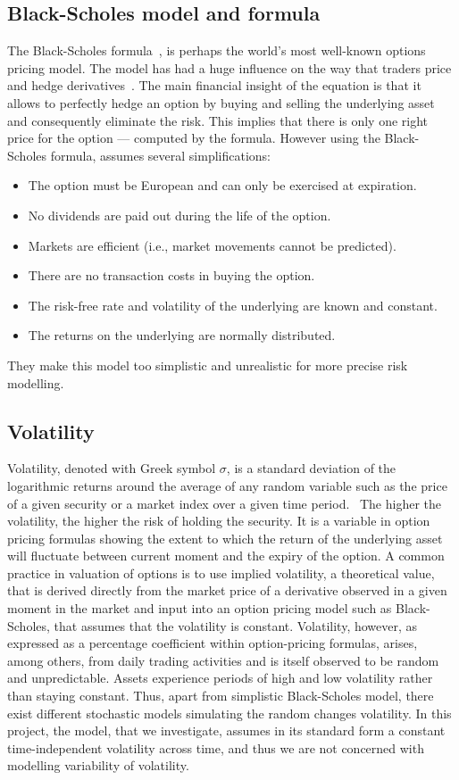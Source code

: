 \subsection{Black-Scholes model and formula}
The Black-Scholes formula~\cite{blackscholes}, is perhaps the world's most well-known options pricing model. The model has had a huge influence on the way that traders price and hedge derivatives~\cite[pg.299-324]{ofod}. The main financial insight of the equation is that it allows to perfectly hedge an option by buying and selling the underlying asset and consequently eliminate the risk. This implies that there is only one right price for the option --- computed by the formula. However using the Black-Scholes formula, assumes several simplifications: 
\begin{itemize}
    \item The option must be European and can only be exercised at expiration.
    \item No dividends are paid out during the life of the option.
    \item Markets are efficient (i.e., market movements cannot be predicted).
    \item There are no transaction costs in buying the option.
    \item The risk-free rate and volatility of the underlying are known and constant.
    \item The returns on the underlying are normally distributed.
\end{itemize}
They make this model too simplistic and unrealistic for more precise risk modelling.

\subsection{Volatility}
Volatility, denoted with Greek symbol $\sigma$, is a standard deviation of the logarithmic returns around the average of any random variable such as the price of a given security or a market index over a given time period.~\cite[pg. 303]{ofod} The higher the volatility, the higher the risk of holding the security. It is a variable in option pricing formulas showing the extent to which the return of the underlying asset will fluctuate between current moment and the expiry of the option. A common practice in valuation of options is to use implied volatility, a theoretical value, that is derived directly from the market price of a derivative observed in a given moment in the market and input into an option pricing model such as Black-Scholes, that assumes that the volatility is constant. Volatility, however, as expressed as a percentage coefficient within option-pricing formulas, arises, among others, from daily trading activities and is itself observed to be random and unpredictable. Assets experience periods of high and low volatility rather than staying constant. Thus, apart from simplistic Black-Scholes model, there exist different stochastic models simulating the random changes volatility. In this project, the model, that we investigate, assumes in its standard form a constant time-independent volatility across time, and thus we are not concerned with modelling variability of volatility.

